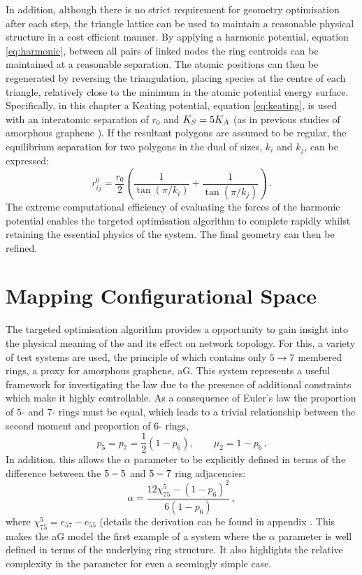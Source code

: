 In addition, although there is no strict requirement for geometry optimisation after each step, the triangle lattice can be used to maintain a reasonable physical structure in a cost efficient manner.
By applying a harmonic potential, equation \eqref{eq:harmonic}, between all pairs of linked nodes the ring centroids can be maintained at a reasonable separation.
The atomic positions can then be regenerated by reversing the triangulation, placing species at the centre of each triangle, relatively close to the minimum in the atomic potential energy surface.
Specifically, in this chapter a Keating potential, equation \eqref{eq:keating}, is used  with an interatomic separation of $r_0$ and $K_S=5K_A$ (as in previous studies of amorphous graphene \cite{Kumar2012}).
If the resultant polygons are assumed to be regular, the equilibrium separation for two polygons in the dual of sizes, $k_i$ and $k_j$, can be expressed:
\begin{equation}
	r_{ij}^0 = \frac{r_0}{2}\left(\frac{1}{\tan\left(\pi/k_i\right)}+\frac{1}{\tan\left(\pi/k_j\right)}\right)\,.
\end{equation}
The extreme computational efficiency of evaluating the forces of the harmonic potential enables the targeted optimisation algorithm to complete rapidly whilst retaining the essential physics of the system.
The final geometry can then be refined.

\section{Mapping Configurational Space}

The targeted optimisation algorithm provides a opportunity to gain insight into the physical meaning of the \aw{} and its effect on network topology.
For this, a variety of test systems are used, the principle of which contains only $5\rightarrow 7$ membered rings, a proxy for amorphous graphene, aG.
This system represents a useful framework for investigating the \aw{} law due to the presence of additional constraints which make it highly controllable. As a consequence of Euler's law the proportion of $5$\-- and $7$\-- rings must be equal, which leads to a trivial relationship between the second moment and proportion of $6$- rings,
\begin{equation}
\label{eq:agcon}
        p_5=p_7=\frac{1}{2}\left(1-p_6\right), \qquad \mu_2=1-p_6 \,.
\end{equation}
In addition, this allows the $\alpha$ parameter to be explicitly defined in terms of the difference between the $5\--5$ and $5\--7$ ring adjacencies:
\begin{equation}
	\label{eq:agalpha}
	\alpha = \frac{12\chi_{75}^5-\left(1-p_6\right)^2}{6\left(1-p_6\right)}\,,
\end{equation}
where $\chi_{75}^5=e_{57}-e_{55}$ (details the derivation can be found in appendix .
This makes the aG model the first example of a system where the $\alpha$ parameter is well defined in terms of the underlying ring structure.
It also highlights the relative complexity in the \aw{} parameter for even a seemingly simple case.

